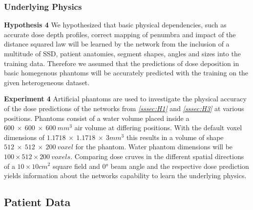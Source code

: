 \subsubsection{Underlying Physics}\label{sssec:H4}
\begin{hanginglist}\itemsep2pt

    \item\textbf{Hypothesis 4}\newline
    We hypothesized that basic physical dependencies, such as accurate dose depth profiles, correct mapping of penumbra and impact of the distance squared law will be learned by the network from the inclusion of a multitude of \acs{SSD}, patient anatomies, segment shapes, angles and sizes into the training data.
    Therefore we assumed that the predictions of dose deposition in basic homegenous phantoms will be accurately predicted with the training on the given heterogeneous dataset.\\

    \item\textbf{Experiment 4}\newline
    Artificial phantoms are used to investigate the physical accuracy of the dose predictions of the networks from \emph{\ref{sssec:H1} } and \emph{\ref{sssec:H3} } at various positions. Phantoms consist of a water volume placed inside a $600~\times~600~\times~600~mm^3$ air volume at differing positions. With the default voxel dimensions of $1.1718~\times~1.1718~\times~3mm^3$ this results in a volume of shape $512~\times~512~\times~200~voxel$ for the phantom. 
    Water phantom dimensions will be $100 \times 512 \times 200~voxels$.
    Comparing dose cruves in the different spatial directions of a $10 \times 10 cm^2$ square field and 0° beam angle and the respective dose prediction yields information about the networks capability to learn the underlying physics.\\

\end{hanginglist}

\subsection{Patient Data}

